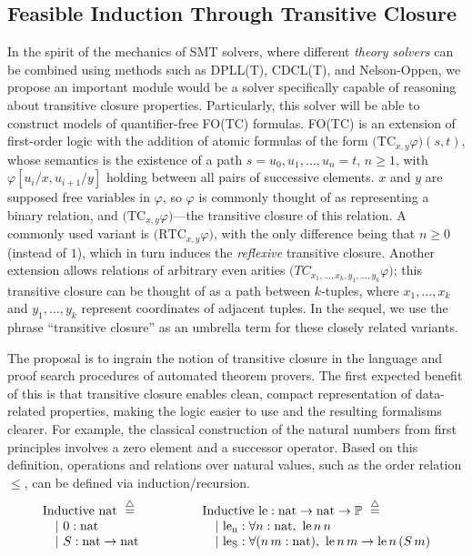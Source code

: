 \subsection{Feasible Induction Through Transitive Closure}

In the spirit of the mechanics of SMT solvers, where different \emph{theory solvers}
can be combined using methods such as DPLL(T), CDCL(T), and Nelson-Oppen, we
propose an important module would be a solver specifically capable of reasoning
about transitive closure properties.
Particularly, this solver will be able to construct models of quantifier-free
FO(TC) formulas.
FO(TC) is an extension of first-order logic with the addition of atomic formulas of the form $\big(\mathrm{TC}_{x,y}\varphi\big)(s,t)$,
whose semantics is the existence of a path $s=u_0,u_1,\ldots,u_n=t$, $n\geq 1$, with $\varphi[u_i/x,u_{i+1}/y]$
holding between all pairs of successive elements.
$x$ and $y$ are supposed free variables in $\varphi$, so $\varphi$ is commonly thought of as representing a binary relation, and $\big(\mathrm{TC}_{x,y}\varphi\big)$---the transitive closure of this relation.
A commonly used variant is $\big(\mathrm{RTC}_{x,y}\varphi\big)$, with the only difference being that $n\geq 0$ (instead of $1$),
which in turn induces the \emph{reflexive} transitive closure.
Another extension allows relations of arbitrary even arities
$\big(TC_{x_1,\ldots,x_k,y_1,\ldots,y_k}\varphi\big)$;
this transitive closure can be thought of as a path between $k$-tuples, where $x_1,\ldots,x_k$ and $y_1,\ldots,y_k$ represent coordinates of adjacent tuples.
In the sequel, we use the phrase ``transitive closure'' as an umbrella term for these closely related variants.

The proposal is to ingrain the notion of transitive closure in the language and proof search procedures of automated theorem provers.
The first expected benefit of this is that transitive closure enables clean, compact representation of data-related properties,
making the logic easier to use and the resulting formalisms clearer.
For example, the classical construction of the natural numbers from first principles involves a zero element and a successor operator.
Based on this definition, operations and relations over natural values, such as the order relation $\leq$, can be defined via induction/recursion.
\[
\begin{array}{l@{\hspace{4em}}l}
\begin{array}[t]{l}
\rInductive~\tnat~\eqdef \\
\quad |~0 : \tnat \\
\quad |~S : \tnat \to\tnat
\end{array}
&
\begin{array}[t]{l}
\rInductive~\fle : \tnat \to \tnat \to \tProp ~\eqdef \\
\quad |~\fctorlen : \forall n:\tnat,~ \fle\,n\,n\\
\quad |~\fctorleS : \forall (n\,m:\tnat),~ \fle\,n\,m\to\fle\,n\,(S\,m)
\end{array}
\end{array}
\]

